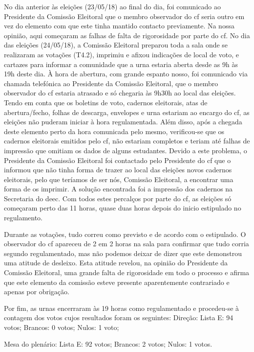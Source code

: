 No dia anterior às eleições (23/05/18) ao final do dia, foi comunicado ao Presidente da Comissão Eleitoral que o membro observador do \acrshort{cf} seria outro em vez do elemento com que este tinha mantido contacto previamente. Na nossa opinião, aqui começaram as falhas de falta de rigorosidade por parte do \acrshort{cf}. No dia das eleições (24/05/18), a Comissão Eleitoral preparou toda a sala onde se realizaram as votações (T4.2), imprimiu e afixou indicações de local de voto, e cartazes para informar a comunidade que a urna estaria aberta desde as 9h às 19h deste dia. À hora de abertura, com grande espanto nosso, foi comunicado via chamada telefónica ao Presidente da Comissão Eleitoral, que o membro observador do \acrshort{cf} estaria atrasado e só chegaria às 9h30h ao local das eleições. Tendo em conta que os boletins de voto, cadernos eleitorais, atas de abertura/fecho, folhas de descarga, envelopes e urna estariam ao encargo do \acrshort{cf}, as eleições não puderam iniciar à hora regulamentada. Além disso, após a chegada deste elemento perto da hora comunicada pelo mesmo, verificou-se que os cadernos eleitorais emitidos pelo \acrshort{cf}, não estariam completos e teriam até falhas de impressão que omitiam os dados de alguns estudantes. Devido a este problema, o Presidente da Comissão Eleitoral foi contactado pelo Presidente do \acrshort{cf} que o informou que não tinha forma de trazer ao local das eleições novos cadernos eleitorais, pelo que teríamos de ser nós, Comissão Eleitoral, a encontrar uma forma de os imprimir. A solução encontrada foi a impressão dos cadernos na Secretaria do \acrshort{deec}. Com todos estes percalços por parte do \acrshort{cf}, as eleições só começaram perto das 11 horas, quase duas horas depois do inicio estipulado no regulamento. 

Durante as votações, tudo correu como previsto e de acordo com o estipulado. O observador do \acrshort{cf} apareceu de 2 em 2 horas na sala para confirmar que tudo corria segundo regulamentado, mas não podemos deixar de dizer que este demonstrou uma atitude de desleixo. Esta atitude revelou, na opinião do Presidente da Comissão Eleitoral, uma grande falta de rigorosidade em todo o processo e afirma que este elemento da comissão esteve presente aparentemente contrariado e apenas por obrigação. 

Por fim, as urnas encerraram às 19 horas como regulamentado e procedeu-se à contagem dos votos cujos resultados foram os seguintes:
Direção: 
Lista E: 94 votos; 
Brancos: 0 votos; 
Nulos: 1 voto; 

Mesa do plenário: 
Lista E: 92 votos; 
Brancos: 2 votos; 
Nulos: 1 votos. 
